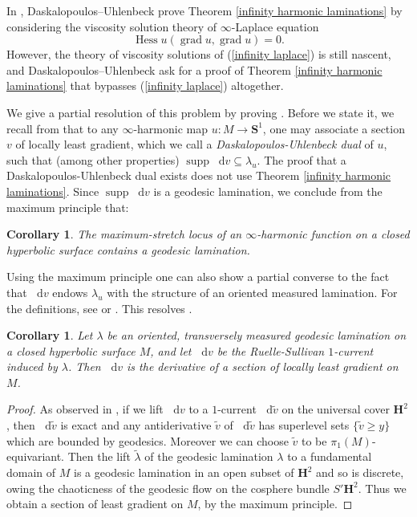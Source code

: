 \documentclass[reqno,10pt]{amsart}
\newcommand{\Hyp}{\mathbf H}
\newcommand{\Sph}{\mathbf S}
\DeclareMathOperator{\Hess}{Hess}
\DeclareMathOperator{\supp}{supp}
\newcommand*\dif{\mathop{}\!\mathrm{d}}
\DeclareMathOperator{\grad}{grad}
\newcommand{\dfn}[1]{\emph{#1}\index{#1}}
\newtheorem{corollary}[theorem]{Corollary}
\theoremstyle{definition}
\numberwithin{equation}{section}
\begin{document}
In \cite[\S5]{daskalopoulos2020transverse}, Daskalopoulos--Uhlenbeck prove Theorem \ref{infinity harmonic laminations} by considering the viscosity solution theory of $\infty$-Laplace equation
\begin{equation}\label{infinity laplace}
    \Hess u(\grad u, \grad u) = 0.
\end{equation}
However, the theory of viscosity solutions of (\ref{infinity laplace}) is still nascent, and Daskalopoulos--Uhlenbeck ask \cite[Problem 9.5]{daskalopoulos2020transverse} for a proof of Theorem \ref{infinity harmonic laminations} that bypasses (\ref{infinity laplace}) altogether.

We give a partial resolution of this problem by proving \cite[Theorem-Conjecture 9.6]{daskalopoulos2020transverse}.
Before we state it, we recall from \cite[\S6]{daskalopoulos2020transverse} that to any $\infty$-harmonic map $u: M \to \Sph^1$, one may associate a section $v$ of locally least gradient, which we call a \dfn{Daskalopoulos-Uhlenbeck dual} of $u$, such that (among other properties) $\supp \dif v \subseteq \lambda_u$.
The proof that a Daskalopoulos-Uhlenbeck dual exists does not use Theorem \ref{infinity harmonic laminations}.
Since $\supp \dif v$ is a geodesic lamination, we conclude from the maximum principle that:

\begin{corollary}\label{maximum stretch contains lamination}
The maximum-stretch locus of an $\infty$-harmonic function on a closed hyperbolic surface contains a geodesic lamination.
\end{corollary}

Using the maximum principle one can also show a partial converse to the fact that $\dif v$ endows $\lambda_u$ with the structure of an oriented measured lamination.
For the definitions, see \cite[\S8]{daskalopoulos2020transverse} or \cite{Ruelle75}.
This resolves \cite[Problem 9.7]{daskalopoulos2020transverse}.

\begin{corollary}\label{ruelle sullivan antiderivative}
Let $\lambda$ be an oriented, transversely measured geodesic lamination on a closed hyperbolic surface $M$, and let $\dif v$ be the Ruelle-Sullivan $1$-current induced by $\lambda$.
Then $\dif v$ is the derivative of a section of locally least gradient on $M$.
\end{corollary}
\begin{proof}
As observed in \cite[\S9]{daskalopoulos2020transverse}, if we lift $\dif v$ to a $1$-current $\dif \tilde v$ on the universal cover $\Hyp^2$, then $\dif \tilde v$ is exact and any antiderivative $\tilde v$ of $\dif \tilde v$ has superlevel sets $\{\tilde v \geq y\}$ which are bounded by geodesics.
Moreover we can choose $\tilde v$ to be $\pi_1(M)$-equivariant.
Then the lift $\tilde \lambda$ of the geodesic lamination $\lambda$ to a fundamental domain of $M$ is a geodesic lamination in an open subset of $\Hyp^2$ and so is discrete, owing the chaoticness of the geodesic flow on the cosphere bundle $S'\Hyp^2$.
Thus we obtain a section of least gradient on $M$, by the maximum principle.
\end{proof}
\end{document}
